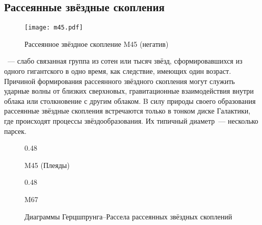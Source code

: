 \subsection{Рассеянные звёздные скопления}

\begin{wrapfigure}[9]{r}{0.3\tw}
    \centering
    \texttt{[image: m45.pdf]}
    \caption{Рассеянное звёздное скопление M45 (негатив)}
\end{wrapfigure}
~--- слабо связанная группа из сотен или тысяч звёзд, сформировавшихся из одного гигантского  в одно время, как следствие, имеющих один возраст. Причиной формирования рассеянного звёздного скопления могут служить ударные волны от близких сверхновых, гравитационные взаимодействия внутри облака или столкновение с другим облаком. B силу природы своего образования рассеянные звёздные скопления встречаются  только в тонком диске Галактики, где происходят процессы звёздообразования. Их типичный диаметр~--- несколько парсек.

\begin{figure}[h!]
    \begin{subcaptionblock}{0.48\tw}
        \centering
        \caption{M45 (Плеяды)}
        \label{pic:hr-m45}
    \end{subcaptionblock}
    \hfill
    \begin{subcaptionblock}{0.48\tw}
        \centering
        \caption{M67}
        \label{pic:hr-m67}
    \end{subcaptionblock}
    \caption{Диаграммы Герцшпрунга--Рассела рассеянных звёздных скоплений}
\end{figure}

